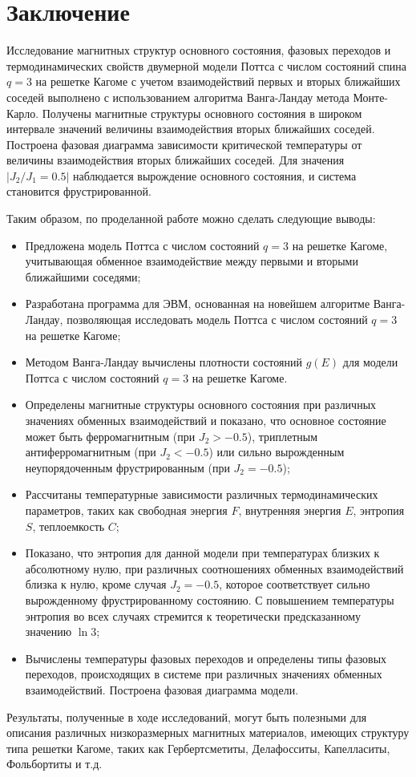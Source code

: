 \section*{Заключение}

Исследование магнитных структур основного состояния, фазовых переходов и термодинамических свойств двумерной модели Поттса с числом состояний спина $q=3$ на решетке Кагоме с учетом взаимодействий первых и вторых ближайших соседей выполнено с использованием алгоритма Ванга-Ландау метода Монте-Карло. Получены магнитные структуры основного состояния в широком интервале значений величины взаимодействия вторых ближайших соседей. Построена фазовая диаграмма зависимости критической температуры от величины взаимодействия вторых ближайших соседей. Для значения $\left| J_2/J_1 = 0.5 \right|$ наблюдается вырождение основного состояния, и система становится фрустрированной.

Таким образом, по проделанной работе можно сделать следующие выводы:
\begin{itemize}
    \item Предложена модель Поттса с числом состояний $q=3$ на решетке Кагоме, учитывающая обменное взаимодействие между первыми и вторыми ближайшими соседями;
    \item Разработана программа для ЭВМ, основанная на новейшем алгоритме Ванга-Ландау, позволяющая исследовать модель Поттса с числом состояний $q=3$ на решетке Кагоме;
    \item Методом Ванга-Ландау вычислены плотности состояний $g(E)$ для модели Поттса с числом состояний $q=3$ на решетке Кагоме.
    \item Определены магнитные структуры основного состояния при различных значениях обменных взаимодействий и показано, что основное состояние может быть ферромагнитным (при $J_2 > -0.5$), триплетным антиферромагнитным (при $J_2 < -0.5$) или сильно вырожденным неупорядоченным фрустрированным (при $J_2 = -0.5$);
    \item Рассчитаны температурные зависимости различных термодинамических параметров, таких как свободная энергия $F$, внутренняя энергия $E$, энтропия $S$, теплоемкость $C$;
    \item Показано, что энтропия для данной модели при температурах близких к абсолютному нулю, при различных соотношениях обменных взаимодействий близка к нулю, кроме случая $J_2 = -0.5$, которое соответствует сильно вырожденному фрустрированному состоянию. С повышением температуры энтропия во всех случаях стремится к теоретически предсказанному значению $\ln 3$;
    \item Вычислены температуры фазовых переходов и определены типы фазовых переходов, происходящих в системе при различных значениях обменных взаимодействий. Построена фазовая диаграмма модели.
\end{itemize}

Результаты, полученные в ходе исследований, могут быть полезными для описания различных низкоразмерных магнитных материалов, имеющих структуру типа решетки Кагоме, таких как Гербертсметиты, Делафосситы, Капелласиты, Фольбортиты и т.д.
